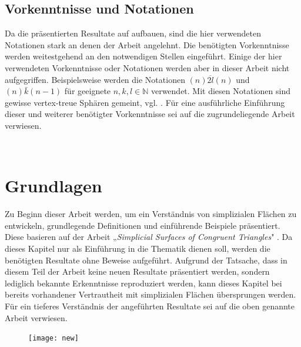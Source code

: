 \documentclass[12pt,titlepage,twoside,cleardoublepage]{article}
\theoremstyle{nummermitklammern}
\numberwithin{equation}{section}
\begin{document}
\subsection{Vorkenntnisse und Notationen}
Da die präsentierten Resultate auf \cite{simp} aufbauen, sind die hier verwendeten Notationen stark an denen der Arbeit angelehnt. Die benötigten Vorkenntnisse werden weitestgehend an den notwendigen Stellen eingeführt.
Einige der hier verwendeten Vorkenntnisse oder Notationen werden aber in dieser Arbeit nicht aufgegriffen.
 Beispielsweise werden die Notationen $(n)\overline{2l}(n)$ und $(n)\bar{k}(n-1)$ für geeignete $n,k,l\in\mathbb{N}$ verwendet. Mit diesen Notationen sind gewisse vertex-treue Sphären gemeint, vgl. \cite{simp}. 
 Für eine ausführliche Einführung dieser und weiterer benötigter Vorkenntnisse sei auf die zugrundeliegende Arbeit verwiesen.

\newpage
\textcolor{white}{...}
\newpage
\section{Grundlagen} \label{Grundlagen}
Zu Beginn dieser Arbeit werden, um ein Verständnis von simplizialen Flächen zu entwickeln, grundlegende Definitionen und einführende Beispiele präsentiert. Diese basieren auf der Arbeit „\emph{Simplicial Surfaces of Congruent Triangles}" \cite{simp}. Da dieses Kapitel nur als Einführung in die Thematik dienen soll, werden die benötigten Resultate ohne Beweise aufgeführt. Aufgrund der Tatsache, dass in diesem Teil der Arbeit keine neuen Resultate präsentiert werden, sondern lediglich bekannte Erkenntnisse reproduziert werden, kann dieses Kapitel bei bereits vorhandener Vertrautheit mit simplizialen Flächen übersprungen werden. Für ein tieferes Verständnis der angeführten Resultate sei auf die oben genannte Arbeit verwiesen. 
\begin{figure}[H]
\begin{center}
\texttt{[image: new]}
\end{center}
\end{figure}
\end{document}
